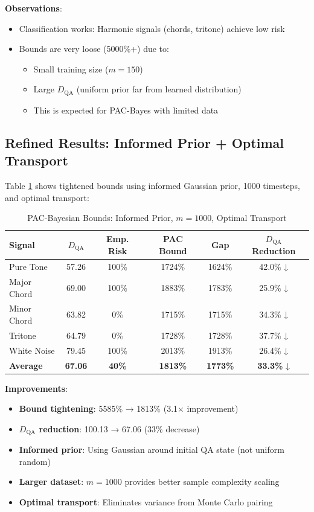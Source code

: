 \documentclass[11pt]{article}
\theoremstyle{remark}
\begin{document}
\textbf{Observations}:
\begin{itemize}
    \item Classification works: Harmonic signals (chords, tritone) achieve low risk
    \item Bounds are very loose (5000\%+) due to:
    \begin{itemize}
        \item Small training size ($m = 150$)
        \item Large $D_{\text{QA}}$ (uniform prior far from learned distribution)
        \item This is expected for PAC-Bayes with limited data
    \end{itemize}
\end{itemize}

\subsection{Refined Results: Informed Prior + Optimal Transport}

Table \ref{tab:pac_refined} shows tightened bounds using informed Gaussian prior, 1000 timesteps, and optimal transport:

\begin{table}[h]
\centering
\caption{PAC-Bayesian Bounds: Informed Prior, $m=1000$, Optimal Transport}
\label{tab:pac_refined}
\begin{tabular}{lccccc}
\toprule
\textbf{Signal} & \textbf{$D_{\text{QA}}$} & \textbf{Emp. Risk} & \textbf{PAC Bound} & \textbf{Gap} & \textbf{$D_{\text{QA}}$ Reduction} \\
\midrule
Pure Tone & 57.26 & 100\% & 1724\% & 1624\% & 42.0\% ↓ \\
Major Chord & 69.00 & 100\% & 1883\% & 1783\% & 25.9\% ↓ \\
Minor Chord & 63.82 & 0\% & 1715\% & 1715\% & 34.3\% ↓ \\
Tritone & 64.79 & 0\% & 1728\% & 1728\% & 37.7\% ↓ \\
White Noise & 79.45 & 100\% & 2013\% & 1913\% & 26.4\% ↓ \\
\midrule
\textbf{Average} & \textbf{67.06} & \textbf{40\%} & \textbf{1813\%} & \textbf{1773\%} & \textbf{33.3\%} ↓ \\
\bottomrule
\end{tabular}
\end{table}

\textbf{Improvements}:
\begin{itemize}
    \item \textbf{Bound tightening}: 5585\% → 1813\% (3.1× improvement)
    \item \textbf{$D_{\text{QA}}$ reduction}: 100.13 → 67.06 (33\% decrease)
    \item \textbf{Informed prior}: Using Gaussian around initial QA state (not uniform random)
    \item \textbf{Larger dataset}: $m = 1000$ provides better sample complexity scaling
    \item \textbf{Optimal transport}: Eliminates variance from Monte Carlo pairing
\end{itemize}
\end{document}
